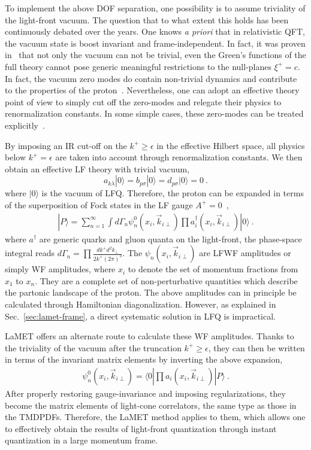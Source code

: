 \documentclass[aps,rmp,reprint,amsmath,amssymb,graphicx,longbibliography]{revtex4-1} %
\begin{document}
To implement the above DOF separation, one possibility is to
assume triviality of the light-front vacuum. The question that to what extent this holds
has been continuously debated over the years.
One knows {\it a priori} that in relativistic QFT, the vacuum state is
boost invariant and frame-independent. In fact, it was proven in~\cite{Nakanishi:1976yx,Nakanishi:1976vf}
that not only the vacuum can not be trivial, even the Green's functions of the full theory cannot
pose generic meaningful restrictions to the null-planes $\xi^+=c$.  In fact, the vacuum
zero modes do contain non-trivial dynamics and contribute to the properties of the proton~\cite{Ji:2020baz}.
Nevertheless, one can adopt an effective theory point of view to simply cut off the zero-modes
and relegate their physics to renormalization constants. In some simple cases, these zero-modes can be
treated explicitly~\cite{Heinzl:1991myy,Yamawaki:1998cy}.

By imposing an IR cut-off on the $k^+\ge \epsilon$ in the effective Hilbert space,
all physics below $k^+=\epsilon$ are taken into account through
renormalization constants. We then obtain an effective LF theory with trivial
vacuum,
\begin{equation}
	a_{k\lambda}|0\rangle = b_{p\sigma}|0\rangle = d_{p\sigma}|0\rangle=0 \ .
\end{equation}
where $|0\rangle $ is the vacuum of LFQ.
Therefore, the proton can be expanded in terms of
the superposition of Fock states in the LF gauge $A^+=0$~\cite{Brodsky:1997de},
\begin{align}
	|P\rangle=\sum_{n=1}^{\infty} \int d\Gamma_n \psi^0_n(x_i,\vec{k}_{i\perp})\prod a^{\dagger}_i(x_i, \vec{k}_{i\perp})|0\rangle \ .
\end{align}
where $a^\dagger$ are generic quarks and gluon quanta on the light-front, the phase-space integral reads $d\Gamma_n=\prod \frac{dk^+d^2k_\perp}{2k^+(2\pi)^3}$. The $\psi_n(x_i,\vec{k}_{i\perp})$
are LFWF amplitudes or simply WF amplitudes, where $x_i$ to denote the set of momentum fractions from $x_1$ to $x_n$.
They are a complete set of non-perturbative quantities which describe the partonic
landscape of the proton. The above amplitudes can in principle be calculated through Hamiltonian
diagonalization. However, as explained in Sec.~\ref{sec:lamet-frame}, a direct systematic
solution in LFQ is impractical.

LaMET offers an alternate route to calculate these WF amplitudes. Thanks to the triviality
of the vacuum after the truncation $k^+\ge \epsilon$, they can then be written in terms of the
invariant matrix elements by inverting the above expansion,
\begin{align}
	\psi^0_n(x_i,\vec{k}_{i\perp})=\langle 0|\prod a_i(x_i,\vec{k}_{i\perp})|P\rangle \ .
\end{align}
After properly restoring gauge-invariance and imposing regularizations, they
become the matrix elements of light-cone correlators, the same type as those in the
TMDPDFs. Therefore, the LaMET method applies to them, which allows one to effectively
obtain the results of light-front quantization through instant quantization in a large momentum frame.
\end{document}

